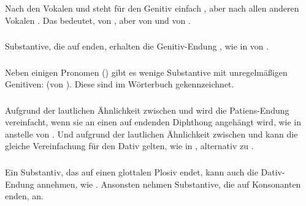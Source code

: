 \subsubsection{} Nach den Vokalen  und  steht für den Genitiv einfach , aber nach allen anderen Vokalen . Das bedeutet,  von , aber  von  und  von .

\subsubsection{} Substantive, die auf  enden, erhalten die Genitiv-Endung , wie in  von .

\subsubsection{} Neben einigen Pronomen () gibt es wenige Substantive mit unregelmäßigen Genitiven:  (von ). Diese sind im Wörterbuch gekennzeichnet.

\subsubsection{} Aufgrund der lautlichen Ähnlichkeit zwischen  und  wird die Patiens-Endung  vereinfacht, wenn sie an einen auf  endenden Diphthong angehängt wird, wie in   anstelle von . Und aufgrund der lautlichen Ähnlichkeit zwischen  und  kann die gleiche Vereinfachung für den Dativ  gelten, wie in  , alternativ zu .

\subsubsection{} Ein Substantiv, das auf einen glottalen Plosiv endet, kann auch die Dativ-Endung  annehmen, wie . Ansonsten nehmen Substantive, die auf Konsonanten enden,  an.

